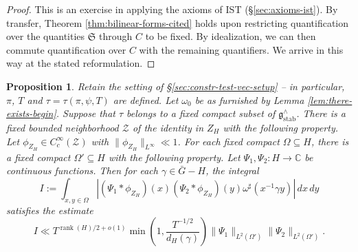 \documentclass[reqno]{amsart}
\DeclareMathOperator{\stab}{stab}
\DeclareMathOperator{\rank}{rank}
\theoremstyle{plain} \newtheorem{theorem} {Theorem}
\newtheorem{proposition} [theorem] {Proposition}
\theoremstyle{definition} \newtheorem{definition} [theorem] {Definition}
\theoremstyle{itplain} %
\numberwithin{equation}{section}
\numberwithin{theorem}{section}
\begin{document}
\begin{proof}
  This is an exercise in applying the axioms of IST (\S\ref{sec:axioms-ist}).  By transfer, Theorem \ref{thm:bilinear-forms-cited} holds upon restricting quantification over the quantities $\mathfrak{S}$ through $C$ to be fixed.  By idealization, we can then commute quantification over $C$ with the remaining quantifiers.  We arrive in this way at the stated reformulation.
\end{proof}

\begin{proposition}\label{prop:standard2:let-tau-belong}
  Retain the setting of \S\ref{sec:constr-test-vec-setup} -- in particular, $\pi$, $T$ and $\tau = \tau(\pi,\psi,T)$ are defined.  Let $\omega_0$ be as furnished by Lemma \ref{lem:there-exists-begin}.  Suppose that $\tau$ belongs to a fixed compact subset of $\mathfrak{g}^\wedge_{\stab}$.  There is a fixed bounded neighborhood $\mathcal{Z}$ of the identity in $Z_H$ with the following property.  Let $\phi_{Z_H} \in C_c^\infty(\mathcal{Z})$ with $\|\phi_{Z_H}\|_{L^\infty} \ll 1$.  For each fixed compact $\Omega \subseteq H$, there is a fixed compact $\Omega ' \subseteq H$ with the following property.  Let $\Psi_1, \Psi_2 : H \rightarrow \mathbb{C}$ be continuous functions.  Then for each $\gamma \in \bar{G} - H$, the integral
  \begin{equation*}
      I := \int _{x, y \in \Omega }
    \left\lvert
      (\Psi_1 \ast \phi_{Z_H})(x)
      (\Psi_2 \ast \phi_{Z_H})(y)
      \omega^\sharp(x^{-1} \gamma y)
    \right\rvert
    \, d x \, d y
  \end{equation*}
  satisfies the estimate
\begin{equation*}
  I \ll
  T^{\rank(H)/2 + o(1)}
  \min\left( 1,
    \frac{T^{-1/2}}{ d_H(\gamma)}
  \right)
    \|\Psi_1\|_{L^2(\Omega')}
    \|\Psi_2\|_{L^2(\Omega')}.
  \end{equation*}
\end{proposition}
\end{document}
